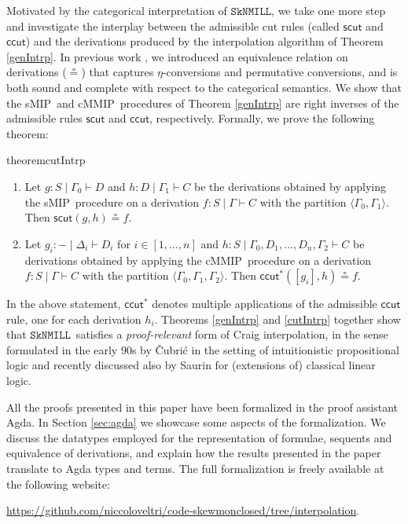 \documentclass[sn-mathphys-num]{sn-jnl}%
\newcommand{\GG}{\Gamma}
\newcommand{\GD}{\Delta}
\newcommand{\vd}{\vdash}
\newcommand{\SkNMILL}{$\mathtt{SkNMILL}$}
\newcommand{\mf}[1]{\mathsf{#1}}
\newcommand{\sMIP}{\textsf{sMIP}}
\newcommand{\cMMIP}{\textsf{cMMIP}}
\theoremstyle{thmstyleone}%
\theoremstyle{thmstyletwo}%
\theoremstyle{thmstylethree}%
\begin{document}
Motivated by the categorical interpretation of \SkNMILL, we take one more step and investigate the interplay between the admissible cut rules (called $\mf{scut}$ and $\mf{ccut}$) and the derivations produced by the interpolation algorithm of Theorem \ref{genIntrp}.
In previous work \cite{UVW:protsn}, we introduced an equivalence relation on derivations ($\circeq$) that captures $\eta$-conversions and permutative conversions, and is both sound and complete with respect to the categorical semantics.
We show that the \sMIP~and \cMMIP~procedures of Theorem \ref{genIntrp} are right inverses of the admissible rules $\mf{scut}$ and $\mf{ccut}$, respectively. Formally, we prove the following theorem:
\begin{restatable*}{theorem}{cutIntrp}\label{cutIntrp}
  ~
  \begin{enumerate}[label=(\roman*)]
    \item Let $g : S \mid \GG_0 \vd D$ and $h : D \mid \GG_1 \vd C$ be the derivations obtained by applying the \sMIP~procedure on a derivation $f: S \mid \GG \vd C$ with the partition $\langle \GG_0 , \GG_1 \rangle$. Then $\mf{scut}(g, h) \circeq f$.
    \item Let $g_i : {-} \mid \GD_i \vd D_i$ for $i \in [1,\dots , n]$ and $h : S \mid \GG_0 , D_1 , \dots, D_n, \GG_2 \vd C$ be derivations obtained by applying the \cMMIP~procedure on a derivation $f: S \mid \GG \vd C$ with the partition $\langle \GG_0 , \GG_1 , \GG_2 \rangle$. Then $\mf{ccut}^*([g_i] , h) \circeq f$.
  \end{enumerate}
\end{restatable*}

In the above statement, $\mf{ccut}^*$ denotes multiple applications of the admissible $\mf{ccut}$ rule, one for each derivation $h_i$.
Theorems \ref{genIntrp} and \ref{cutIntrp} together show that \SkNMILL\ satisfies a \emph{proof-relevant} form of Craig interpolation, in the sense  formulated in the early 90s by {\v{C}}ubri{\'c} \cite{Cubric1994} in the setting of intuitionistic propositional logic and recently discussed also by Saurin \cite{Saurin2024} for (extensions of) classical linear logic.

All the proofs presented in this paper have been formalized in the proof assistant Agda.
In Section \ref{sec:agda} we showcase some aspects of the formalization.
We discuss the datatypes employed for the representation of formulae, sequents and equivalence of derivations, and explain how the results presented in the paper translate to Agda types and terms.
The full formalization is freely available at the following website:
\begin{center}
  \url{https://github.com/niccoloveltri/code-skewmonclosed/tree/interpolation}.
\end{center}
\end{document}

